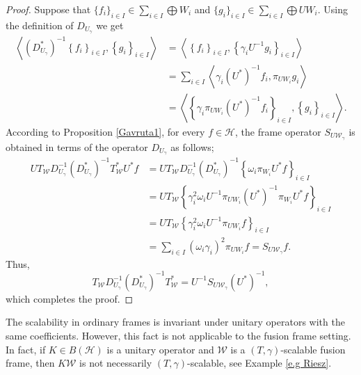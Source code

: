 \documentclass[sn-mathphys-num]{sn-jnl}%
\theoremstyle{definition}
\theoremstyle{remark}
\numberwithin{equation}{section}
\begin{document}
\begin{proof}
Suppose that $\{f_{i}\}_{i\in I} \in \sum_{i \in I}\bigoplus W_{i}$  and $\{g_{i}\}_{i\in I}\in \sum_{i \in I}\bigoplus UW_{i}$. Using the definition of $D_{U_{\gamma}}$ we get
\begin{align*}
\left\langle  \left( D_{U_{\gamma}}^{*}\right) ^{-1}\left\lbrace f_{i}\right\rbrace _{i\in I},\left\lbrace g_{i}\right\rbrace _{i\in I}\right\rangle  &= \left\langle \left\lbrace f_{i}\right\rbrace _{i\in I},\left\lbrace \gamma_{i}{U}^{-1}g_{i}\right\rbrace _{i\in I}\right\rangle 
\\&=\sum_{i \in I}\left\langle  \gamma_{i}\left( {U}^{*}\right) ^{-1}f_{i},\pi_{UW_{i}}g_{i}\right\rangle 
\\&= \left\langle \left\lbrace \gamma_{i}\pi_{UW_{i}}\left( {U}^{*}\right) ^{-1}f_{i}\right\rbrace _{i\in I},\left\lbrace g_{i}\right\rbrace _{i\in I}\right\rangle  .
\end{align*}
According to Proposition \ref{Gavruta1}, for every $f \in \mathcal {H}$, the frame operator $S_{U\mathcal{W}_{\gamma}}$ is obtained in terms of the operator $D_{U_{\gamma}}$ as follows;
\begin{align*}
UT_{\mathcal{W}}D_{U_{\gamma}}^{-1}\left( D_{U_{\gamma}}^{*}\right) ^{-1}T_{\mathcal{W}}^{*}U^{*}f&=UT_{\mathcal{W}}D_{U_{\gamma}}^{-1}\left( D_{U_{\gamma}}^{*}\right) ^{-1}\left\lbrace \omega_{i}\pi_{W_{i}}U^{*}f\right\rbrace _{i\in I}
\\&=UT_{\mathcal{W}}\left\lbrace \gamma_{i}^{2}\omega_{i}U^{-1}\pi_{UW_{i}}\left( {U}^{*}\right) ^{-1}\pi_{W_{i}}U^{*}f\right\rbrace _{i\in I}
\\&=UT_{\mathcal{W}}\left\lbrace \gamma_{i}^{2}\omega_{i}U^{-1}\pi_{UW_{i}}f\right\rbrace _{i\in I}
\\&=\sum_{i \in I}\left( \omega_{i}\gamma_{i}\right) ^{2}\pi_{UW_{i}}f=S_{U\mathcal{W}_{\gamma}}f.
\end{align*}
Thus,
\begin{equation*}
T_{\mathcal{W}}D_{U_{\gamma}}^{-1}\left( D_{U_{\gamma}}^{*}\right) ^{-1}T_{\mathcal{W}}^{*}=U^{-1}S_{U\mathcal{W}_{\gamma}}\left( U^{*}\right) ^{-1},
\end{equation*}
which completes the proof.
\end{proof}

The scalability in ordinary frames is invariant under unitary operators with the same coefficients. However, this fact is not applicable to the fusion frame setting. In fact, if $K\in B(\mathcal{H})$ is a unitary operator and $\mathcal{W}$ is a $(T,\gamma)$-scalable fusion frame, then $K\mathcal{W}$ is not necessarily $(T,\gamma)$-scalable, see Example \ref{e.g Riesz}. 
\end{document}
